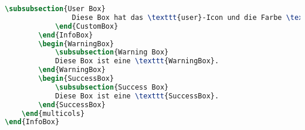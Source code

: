\begin{lstlisting}[language=tex]
                \subsubsection{User Box}
                Diese Box hat das \texttt{user}-Icon und die Farbe \texttt{blue}.
            \end{CustomBox}
        \end{InfoBox}
        \begin{WarningBox}
            \subsubsection{Warning Box}
            Diese Box ist eine \texttt{WarningBox}.
        \end{WarningBox}
        \begin{SuccessBox}
            \subsubsection{Success Box}
            Diese Box ist eine \texttt{SuccessBox}.
        \end{SuccessBox}
    \end{multicols}
\end{InfoBox}
\end{lstlisting}
\fi
